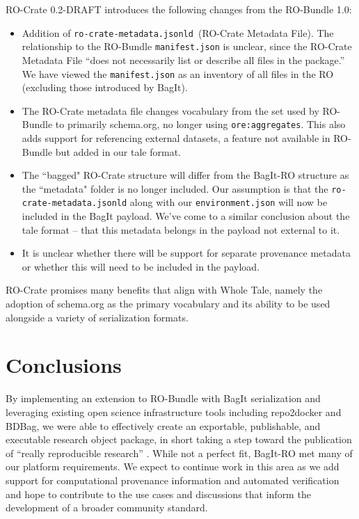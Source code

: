 \documentclass[conference]{IEEEtran}
\begin{document}
RO-Crate 0.2-DRAFT introduces the following changes from the RO-Bundle 1.0:
\begin{itemize}
\item{Addition of \texttt{ro-crate-metadata.jsonld }(RO-Crate Metadata File). The relationship to the RO-Bundle \texttt{manifest.json} is unclear, since the RO-Crate Metadata File ``does not necessarily list or describe all files in the package.'' We have viewed the \texttt{manifest.json} as an inventory of all files in the RO (excluding those introduced by BagIt).}
\item{The RO-Crate metadata file changes vocabulary from the set used by RO-Bundle to primarily schema.org, no longer using \texttt{ore:aggregates}. This also adds support for referencing external datasets, a feature not available in RO-Bundle but added in our tale format.}
\item{The ``bagged" RO-Crate structure will differ from the BagIt-RO structure as the ``metadata" folder is no longer included.  Our assumption is that the \texttt{ro-crate-metadata.jsonld} along with our \texttt{environment.json} will now be included in the BagIt payload. We've come to a similar conclusion about the tale format -- that this metadata belongs in the payload not external to it.}
\item{It is unclear whether there will be support for separate provenance metadata or whether this will need to be included in the payload.}
\end{itemize}

RO-Crate promises many benefits that align with Whole Tale, namely the adoption of schema.org as the primary vocabulary and its ability to be used alongside a variety of serialization formats. 

\section{Conclusions} \label{conclusion}
By implementing an extension to RO-Bundle with BagIt serialization and leveraging existing open science infrastructure tools including repo2docker and BDBag, we were able to effectively create an exportable, publishable, and executable research object package, in short taking a step toward the publication of ``really reproducible research'' \cite{claerbout1992}.  While not a perfect fit, BagIt-RO met many of our platform requirements. We expect to continue work in this area as we add support for computational provenance information and automated verification and hope to contribute to the use cases and discussions that inform the development of a broader community standard.
\end{document}
